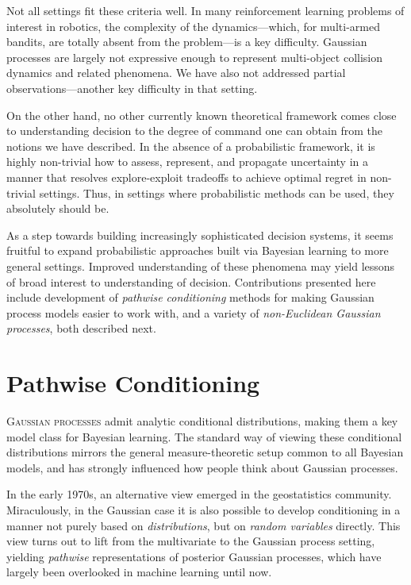 \documentclass[11pt]{book}
\begin{document}
Not all settings fit these criteria well.
In many reinforcement learning problems of interest in robotics, the complexity of the dynamics---which, for multi-armed bandits, are totally absent from the problem---is a key difficulty.
Gaussian processes are largely not expressive enough to represent multi-object collision dynamics and related phenomena.
We have also not addressed partial observations---another key difficulty in that setting.

On the other hand, no other currently known theoretical framework comes close to understanding decision to the degree of command one can obtain from the notions we have described.
In the absence of a probabilistic framework, it is highly non-trivial how to assess, represent, and propagate uncertainty in a manner that resolves explore-exploit tradeoffs to achieve optimal regret in non-trivial settings.
Thus, in settings where probabilistic methods can be used, they absolutely should be.

As a step towards building increasingly sophisticated decision systems, it seems fruitful to expand probabilistic approaches built via Bayesian learning to more general settings.
Improved understanding of these phenomena may yield lessons of broad interest to understanding of decision.
Contributions presented here include development of \emph{pathwise conditioning} methods for making Gaussian process models easier to work with, and a variety of \emph{non-Euclidean Gaussian processes}, both described next.


\chapter{Pathwise Conditioning}
\label{ch:pathwise}

\lettrine{G}{aussian processes} admit analytic conditional distributions, making them a key model class for Bayesian learning.
The standard way of viewing these conditional distributions mirrors the general measure-theoretic setup common to all Bayesian models, and has strongly influenced how people think about Gaussian processes.

In the early 1970s, an alternative view emerged in the geostatistics community.
Miraculously, in the Gaussian case it is also possible to develop conditioning in a manner not purely based on \emph{distributions}, but on \emph{random variables} directly.
This view turns out to lift from the multivariate to the Gaussian process setting, yielding \emph{pathwise} representations of posterior Gaussian processes, which have largely been overlooked in machine learning until now.
\end{document}
